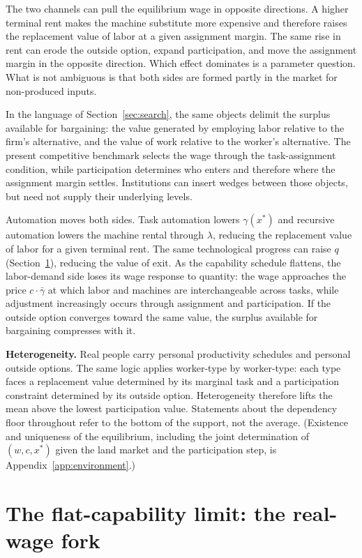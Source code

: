 \documentclass[12pt]{article}
\theoremstyle{plain}
\begin{document}
The two channels can pull the equilibrium wage in opposite directions. A higher
terminal rent makes the machine substitute more expensive and therefore raises
the replacement value of labor at a given assignment margin. The same rise in
rent can erode the outside option, expand participation, and move the assignment
margin in the opposite direction. Which effect dominates is a parameter
question. What is not ambiguous is that both sides are formed partly in the
market for non-produced inputs.

In the language of Section~\ref{sec:search}, the same objects delimit the surplus
available for bargaining: the value generated by employing labor relative to
the firm's alternative, and the value of work relative to the worker's
alternative. The present competitive benchmark selects the wage through the
task-assignment condition, while participation determines who enters and
therefore where the assignment margin settles. Institutions can insert wedges
between those objects, but need not supply their underlying levels.

Automation moves both sides. Task automation lowers $\gamma(x^*)$ and recursive
automation lowers the machine rental through $\lambda$, reducing the replacement
value of labor for a given terminal rent. The same technological progress can
raise $q$ (Section~\ref{sec:limit}), reducing the value of exit. As the capability
schedule flattens, the labor-demand side loses its wage response to quantity: the
wage approaches the price $c\cdot\bar{\gamma}$ at which labor and machines are
interchangeable across tasks, while adjustment increasingly occurs through
assignment and participation. If the outside option
converges toward the same value, the surplus available for bargaining compresses
with it.

\textbf{Heterogeneity.} Real people carry personal productivity schedules and
personal outside options. The same logic applies worker-type by worker-type:
each type faces a replacement value determined by its marginal task and a
participation constraint determined by its outside option. Heterogeneity
therefore lifts the mean above the lowest participation value. Statements about
the dependency floor throughout refer to the bottom of the support, not the
average. (Existence and uniqueness of the equilibrium, including the joint
determination of $(w,c,x^*)$ given the land market and the participation step,
is Appendix~\ref{app:environment}.)

\section{The flat-capability limit: the real-wage fork}\label{sec:limit}
\end{document}
